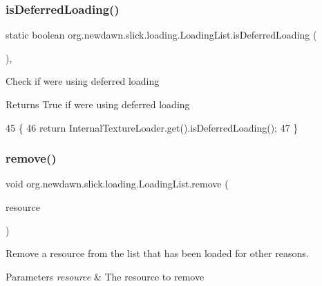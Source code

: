 \subsubsection{\texorpdfstring{is\+Deferred\+Loading()}{isDeferredLoading()}}
{\footnotesize\ttfamily static boolean org.\+newdawn.\+slick.\+loading.\+Loading\+List.\+is\+Deferred\+Loading (\begin{DoxyParamCaption}{ }\end{DoxyParamCaption})\hspace{0.3cm}{\ttfamily [inline]}, {\ttfamily [static]}}

Check if we\textquotesingle{}re using deferred loading

\begin{DoxyReturn}{Returns}
True if we\textquotesingle{}re using deferred loading 
\end{DoxyReturn}

\begin{DoxyCode}
45                                               \{
46         \textcolor{keywordflow}{return} InternalTextureLoader.get().isDeferredLoading();
47     \}
\end{DoxyCode}
\mbox{\label{classorg_1_1newdawn_1_1slick_1_1loading_1_1_loading_list_a92d80f591b97a13c9e9b9a6c0c1b359b}} 
\subsubsection{\texorpdfstring{remove()}{remove()}}
{\footnotesize\ttfamily void org.\+newdawn.\+slick.\+loading.\+Loading\+List.\+remove (\begin{DoxyParamCaption}\item[{\mbox{\hyperlink{interfaceorg_1_1newdawn_1_1slick_1_1loading_1_1_deferred_resource}{Deferred\+Resource}}}]{resource }\end{DoxyParamCaption})\hspace{0.3cm}{\ttfamily [inline]}}

Remove a resource from the list that has been loaded for other reasons.


\begin{DoxyParams}{Parameters}
{\em resource} & The resource to remove \\
\hline
\end{DoxyParams}

